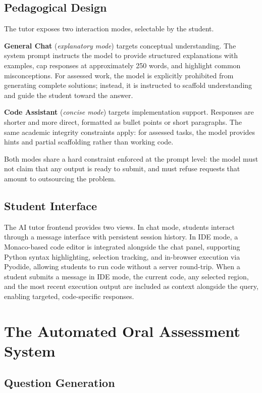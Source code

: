\subsection{Pedagogical Design}

The tutor exposes two interaction modes, selectable by the student.

\textbf{General Chat} (\textit{explanatory mode}) targets conceptual understanding. The system prompt instructs the model to provide structured explanations with examples, cap responses at approximately 250 words, and highlight common misconceptions. For assessed work, the model is explicitly prohibited from generating complete solutions; instead, it is instructed to scaffold understanding and guide the student toward the answer.

\textbf{Code Assistant} (\textit{concise mode}) targets implementation support. Responses are shorter and more direct, formatted as bullet points or short paragraphs. The same academic integrity constraints apply: for assessed tasks, the model provides hints and partial scaffolding rather than working code.

Both modes share a hard constraint enforced at the prompt level: the model must not claim that any output is ready to submit, and must refuse requests that amount to outsourcing the problem.

\subsection{Student Interface}

The AI tutor frontend provides two views. In chat mode, students interact through a message interface with persistent session history. In IDE mode, a Monaco-based code editor is integrated alongside the chat panel, supporting Python syntax highlighting, selection tracking, and in-browser execution via Pyodide, allowing students to run code without a server round-trip. When a student submits a message in IDE mode, the current code, any selected region, and the most recent execution output are included as context alongside the query, enabling targeted, code-specific responses.

\section{The Automated Oral Assessment System}

\subsection{Question Generation}

